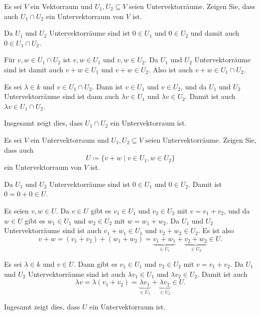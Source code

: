 \begin{question}
 Es sei $V$ ein Vektorraum und $U_1, U_2 \subseteq V$ seien Untervektorräume. Zeigen Sie, dass auch $U_1 \cap U_2$ ein Untervektorraum von $V$ ist.
\end{question}
\begin{solution}
 Da $U_1$ und $U_2$ Untervektorräume sind ist $0 \in U_1$ und $0 \in U_2$ und damit auch $0 \in U_1 \cap U_2$.
 
 Für $v,w \in U_1 \cap U_2$ ist $v,w \in U_1$ und $v,w \in U_2$. Da $U_1$ und $U_2$ Untervektorräume sind ist damit auch $v+w \in U_1$ und $v+w \in U_2$. Also ist auch $v+w \in U_1 \cap U_2$.
 
 Es sei $\lambda \in k$ und $v \in U_1 \cap U_2$. Dann ist $v \in U_1$ und $v \in U_2$, und da $U_1$ und $U_2$ Untervektorräume sind ist dann auch $\lambda v \in U_1$ und $\lambda v \in U_2$. Damit ist auch $\lambda v \in U_1 \cap U_2$.
 
 Insgesamt zeigt dies, dass $U_1 \cap U_2$ ein Untervektorraum ist.
\end{solution}


\begin{question}
 Es sei $V$ ein Untervektorraum und $U_1, U_2 \subseteq V$ seien Untervektorräume. Zeigen Sie, dass auch
 \[
  U \coloneqq \{v + w \mid v \in U_1, w \in U_2\}
 \]
 ein Untervektorraum von $V$ ist.
\end{question}
\begin{solution}
 Da $U_1$ und $U_2$ Untervektorräume sind ist $0 \in U_1$ und $0 \in U_2$. Damit ist $0 = 0 + 0 \in U$.
 
 Es seien $v, w \in U$. Da $v \in U$ gibt es $v_1 \in U_1$ und $v_2 \in U_2$ mit $v = v_1 + v_2$, und da $w \in U$ gibt es $w_1 \in U_1$ und $w_2 \in U_2$ mit $w = w_1 + w_2$. Da $U_1$ und $U_2$ Untervektorräume sind ist auch $v_1 + w_1 \in U_1$ und $v_2 + w_2 \in U_2$. Es ist also
 \[
  v + w
  = (v_1 + v_2) + (w_1 + w_2)
  = \underbrace{v_1 + w_1}_{\in U_1} + \underbrace{v_2 + w_2}_{\in U_2}
  \in U.
 \]
 
 Es sei $\lambda \in k$ und $v \in U$. Dann gibt es $v_1 \in U_1$ und $v_2 \in U_2$ mit $v = v_1 + v_2$. Da $U_1$ und $U_2$ Untervektorräume sind ist auch $\lambda v_1 \in U_1$ und $\lambda v_2 \in U_2$. Damit ist auch
 \[
  \lambda v
  = \lambda (v_1 + v_2)
  = \underbrace{\lambda v_1}_{\in U_1} + \underbrace{\lambda v_2}_{\in U_2}
  \in U.
 \]
 
 Ingesamt zeigt dies, dass $U$ ein Untervektorraum ist.
\end{solution}


